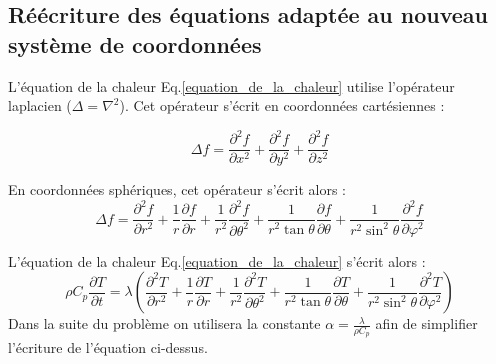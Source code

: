 \documentclass[fleqn]{article}
\begin{document}
\subsection{Réécriture des équations adaptée au nouveau système de coordonnées}
 
L'équation de la chaleur Eq.\eqref{equation_de_la_chaleur} utilise l'opérateur laplacien ($\Delta = \nabla^2$). Cet opérateur s'écrit en coordonnées cartésiennes :

\begin{equation}
    \Delta f = {\frac {\partial ^{2}f }{\partial x^{2}}}+{\frac {\partial ^{2}f }{\partial y^{2}}}+{\frac {\partial ^{2}f }{\partial z^{2}}}
\end{equation}

En coordonnées sphériques, cet opérateur s'écrit alors :
\begin{equation}
     \Delta f={\frac {\partial ^{2}f}{\partial r^{2}}}+{\frac {1}{r}}{\frac {\partial f}{\partial r}}+{\frac {1}{r^{2}}}{\frac {\partial ^{2}f}{\partial \theta ^{2}}}+{\frac {1}{r^{2}\tan \theta }}{\frac {\partial f}{\partial \theta }}+{\frac {1}{r^{2}\sin ^{2}\theta }}{\frac {\partial ^{2}f}{\partial \varphi ^{2}}}
\end{equation}

L'équation de la chaleur Eq.\eqref{equation_de_la_chaleur} s'écrit alors :
\begin{equation}
    \rho C_p \frac{ \partial T}{\partial t}  = \lambda \left( 
    {\frac {\partial ^{2}T}{\partial r^{2}}}+{\frac {1}{r}}{\frac {\partial T}{\partial r}}+{\frac {1}{r^{2}}}{\frac {\partial ^{2}T}{\partial \theta ^{2}}}+{\frac {1}{r^{2}\tan \theta }}{\frac {\partial T}{\partial \theta }}+{\frac {1}{r^{2}\sin ^{2}\theta }}{\frac {\partial ^{2}T}{\partial \varphi ^{2}}} \right)      
\end{equation}
Dans la suite du problème on utilisera la constante $\alpha = \frac{\lambda}{\rho C_p}$ afin de simplifier l'écriture de l'équation ci-dessus.
\end{document}
